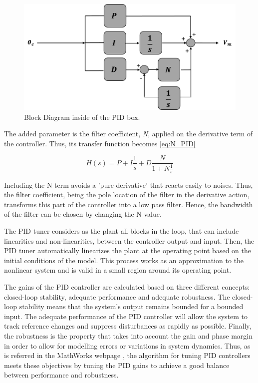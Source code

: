 \begin{figure}[H]
\centering
\includegraphics[scale=0.6]{figures/controller_box.png}
\caption{Block Diagram inside of the PID box.}
\label{PID_box_N}
\end{figure}

The added parameter is the filter coefficient, \textit{N}, applied on the derivative term of the controller. Thus, its transfer function becomes \ref{eq:N_PID}

\begin{equation}\label{eq:N_PID}
H(s) = P + I\frac{1}{s} + D\frac{N}{1+N\frac{1}{s}}
\end{equation}

Including the N term avoids a 'pure derivative' that reacts easily to noises. Thus, the filter coefficient, being the pole location of the filter in the derivative action, transforms this part of the controller into a low pass filter. Hence, the bandwidth of the filter can be chosen by changing the N value.\par

\vspace{5mm}


The PID tuner considers as the plant all blocks in the loop, that can include linearities and non-linearities, between the controller output and input. Then, the PID tuner automatically linearizes the plant at the operating point based on the initial conditions of the model. This process works as an approximation to the nonlinear system and is valid in a small region around its operating point.\par

The gains of the PID controller are calculated based on three different concepts: closed-loop stability, adequate performance and adequate robustness. The closed-loop stability means that the system’s output remains bounded for a bounded input. The adequate performance of the PID controller will allow the system to track reference changes and suppress disturbances as rapidly as possible. Finally, the robustness is the property that takes into account the gain and phase margin in order to allow for modelling errors or variations in system dynamics. Thus, as is referred in the MathWorks webpage \cite{mathworks}, the algorithm for tuning PID controllers meets these objectives by tuning the PID gains to achieve a good balance between performance and robustness.



